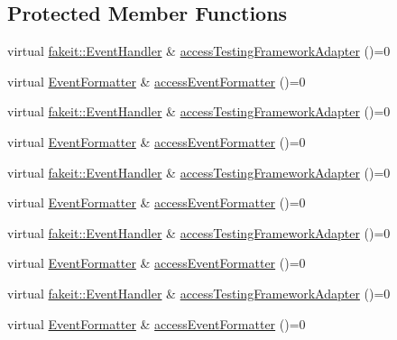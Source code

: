 \subsection*{Protected Member Functions}
\begin{DoxyCompactItemize}
\item 
virtual \mbox{\hyperlink{structfakeit_1_1EventHandler}{fakeit\+::\+Event\+Handler}} \& \mbox{\hyperlink{classfakeit_1_1AbstractFakeit_a9476180a503524d49d1978fbbc125b01}{access\+Testing\+Framework\+Adapter}} ()=0
\item 
virtual \mbox{\hyperlink{structfakeit_1_1EventFormatter}{Event\+Formatter}} \& \mbox{\hyperlink{classfakeit_1_1AbstractFakeit_a443a7ac12208c55f2ae4fa072e983476}{access\+Event\+Formatter}} ()=0
\item 
virtual \mbox{\hyperlink{structfakeit_1_1EventHandler}{fakeit\+::\+Event\+Handler}} \& \mbox{\hyperlink{classfakeit_1_1AbstractFakeit_a9476180a503524d49d1978fbbc125b01}{access\+Testing\+Framework\+Adapter}} ()=0
\item 
virtual \mbox{\hyperlink{structfakeit_1_1EventFormatter}{Event\+Formatter}} \& \mbox{\hyperlink{classfakeit_1_1AbstractFakeit_a443a7ac12208c55f2ae4fa072e983476}{access\+Event\+Formatter}} ()=0
\item 
virtual \mbox{\hyperlink{structfakeit_1_1EventHandler}{fakeit\+::\+Event\+Handler}} \& \mbox{\hyperlink{classfakeit_1_1AbstractFakeit_a9476180a503524d49d1978fbbc125b01}{access\+Testing\+Framework\+Adapter}} ()=0
\item 
virtual \mbox{\hyperlink{structfakeit_1_1EventFormatter}{Event\+Formatter}} \& \mbox{\hyperlink{classfakeit_1_1AbstractFakeit_a443a7ac12208c55f2ae4fa072e983476}{access\+Event\+Formatter}} ()=0
\item 
virtual \mbox{\hyperlink{structfakeit_1_1EventHandler}{fakeit\+::\+Event\+Handler}} \& \mbox{\hyperlink{classfakeit_1_1AbstractFakeit_a9476180a503524d49d1978fbbc125b01}{access\+Testing\+Framework\+Adapter}} ()=0
\item 
virtual \mbox{\hyperlink{structfakeit_1_1EventFormatter}{Event\+Formatter}} \& \mbox{\hyperlink{classfakeit_1_1AbstractFakeit_a443a7ac12208c55f2ae4fa072e983476}{access\+Event\+Formatter}} ()=0
\item 
virtual \mbox{\hyperlink{structfakeit_1_1EventHandler}{fakeit\+::\+Event\+Handler}} \& \mbox{\hyperlink{classfakeit_1_1AbstractFakeit_a9476180a503524d49d1978fbbc125b01}{access\+Testing\+Framework\+Adapter}} ()=0
\item 
virtual \mbox{\hyperlink{structfakeit_1_1EventFormatter}{Event\+Formatter}} \& \mbox{\hyperlink{classfakeit_1_1AbstractFakeit_a443a7ac12208c55f2ae4fa072e983476}{access\+Event\+Formatter}} ()=0

\end{DoxyCompactItemize}
